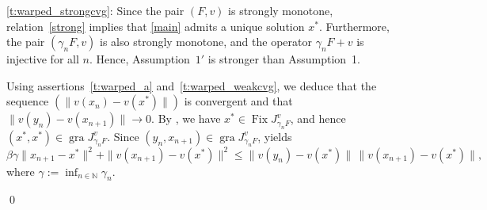\documentclass[11pt]{article}
\makeatletter
\renewenvironment{proof}[1][\proofname]{\par
	\normalfont
	\topsep0\p@\@plus3\p@ \trivlist
	\item[\hskip\labelsep\itshape
	#1\@addpunct{.}]\ignorespaces
}{%
	\qed\endtrivlist
}
\theoremstyle{definition}
\theoremstyle{definition}
\theoremstyle{definition}
\newcommand{\gra}{\ensuremath{\operatorname{gra}}}
\newcommand{\Fix}{\ensuremath{\operatorname{Fix}}}
\makeatother
\begin{document}
\begin{proof}
\medskip
\ref{t:warped_strongcvg}: 
{Since the pair \((F,v)\) is strongly monotone, relation~\eqref{strong}
implies that \eqref{main} admits a unique solution \(x^*\).
Furthermore, the pair \((\gamma_n F, v)\) is also strongly monotone, and
the operator \(\gamma_n F + v\) is injective for all \(n\).
Hence, Assumption~\(1'\) is stronger than Assumption~1.}

{Using assertions~\ref{t:warped_a} and~\ref{t:warped_weakcvg}, we deduce that the
sequence \((\|v(x_n)-v(x^*)\|)\) is convergent and that
\(\|v(y_n)-v(x_{n+1})\|\to 0\).
By \cite[Proposition~3.1(ii)]{LDT}, we have \(x^* \in \Fix J_{\gamma_n F}^v\),
and hence \((x^*,x^*) \in \gra J_{\gamma_n F}^v\).
Since \((y_n,x_{n+1}) \in \gra J_{\gamma_n F}^v\),
\cite[Proposition~3.3(ii)]{LDT} yields
$$
\beta \gamma \|x_{n+1}-x^*\|^2
+ \|v(x_{n+1})-v(x^*)\|^2
\le
\|v(y_n)-v(x^*)\|\,\|v(x_{n+1})-v(x^*)\|,
$$
where \(\gamma := \inf_{n\in\mathbb{N}} \gamma_n\).
}
%
%
%
%

\end{proof}
\end{document}
